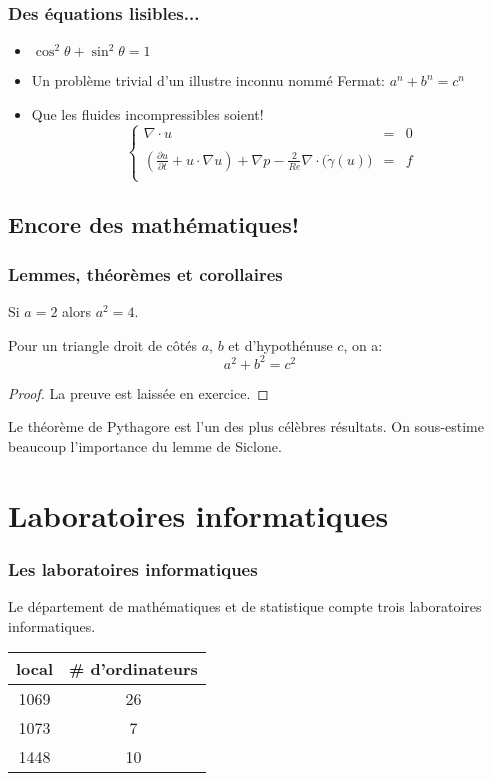 \documentclass{beamer}
\begin{document}
\begin{frame}
\frametitle{Des équations lisibles...}
\begin{itemize}
\item<1> $ \cos^2\theta + \sin^2\theta = 1 $
\item<2> Un problème trivial d'un illustre inconnu nommé Fermat: $a^n  + b^n = c^n$
\item<3> Que les fluides incompressibles soient!
\[
\left\{
\begin{array}{rcl}

 \nabla{}\cdot  u & =& 0\\
\\
  \displaystyle  \left(\frac{\partial  u}{\partial t} + u \cdot \nabla{ u}\right)+\nabla{p} -  
  \frac{2}{Re}\nabla{} \cdot \big(\dot\gamma( u)\big) & =&  f \\
\end{array}
\right.
\]
\end{itemize}
\end{frame}

\subsection{Encore des mathématiques!}
\begin{frame}
\frametitle{Lemmes, théorèmes et corollaires}
\begin{lemma}[Siclone]
\label{trivia}
Si $a=2$ alors $a^2 = 4$.
\end{lemma}

\begin{theorem}[Pythagore]
\label{th_pyt}
   Pour un triangle droit de côtés $a$, $b$ et d'hypothénuse $c$, on a:
\[
  a^2 + b^2 = c^2
\]
\end{theorem}
\begin{proof}
La preuve est laissée en exercice.
\end{proof}
Le théorème de Pythagore est l'un des plus célèbres résultats.
On sous-estime beaucoup l'importance du lemme de Siclone. 
\end{frame}

\section{Laboratoires informatiques}
\begin{frame}
\frametitle{Les laboratoires informatiques}
Le département de mathématiques et de statistique compte
trois laboratoires informatiques.\\
\begin{center}
\begin{tabular}{|c|c|} \hline
{\bf local} & {\bf \# d'ordinateurs} \\ \hline \hline
1069 & 26 \\ \hline
1073 & 7  \\ \hline
1448 & 10 \\ \hline
\end{tabular}
\end{center}
\end{frame}
\end{document}
